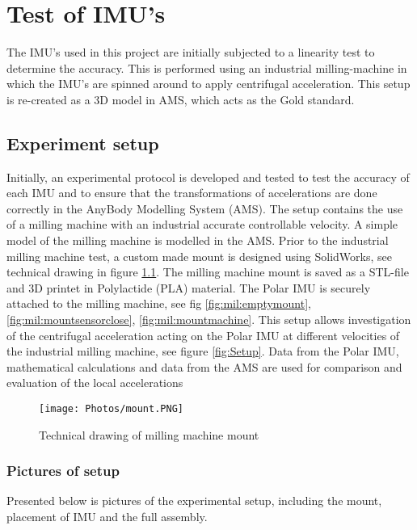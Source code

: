 \chapter{Test of IMU's}\label{ch:ST}

The IMU's used in this project are initially subjected to a linearity test to determine the accuracy. This is performed using an industrial milling-machine in which the IMU's are spinned around to apply centrifugal acceleration. This setup is re-created as a 3D model in AMS, which acts as the Gold standard.

\section{Experiment setup}

Initially, an experimental protocol is developed and tested to test the accuracy of each IMU and to ensure that the transformations of accelerations are done correctly in the AnyBody Modelling System (AMS). The setup contains the use of a milling machine with an industrial accurate controllable velocity. A simple model of the milling machine is modelled in the AMS. Prior to the industrial milling machine test, a custom made mount is designed using SolidWorks, see technical drawing in figure \ref{fig:mount}. The milling machine mount is saved as a STL-file and 3D printet in Polylactide (PLA) material. The Polar IMU is securely attached to the milling machine, see fig \ref{fig:mil:emptymount}, \ref{fig:mil:mountsensorclose}, \ref{fig:mil:mountmachine}. This setup allows investigation of the centrifugal acceleration acting on the Polar IMU at different velocities of the industrial milling machine, see figure \ref{fig:Setup}. Data from the Polar IMU, mathematical calculations and data from the AMS are used for comparison and evaluation of the local accelerations \newline 

\begin{figure}[h!]
    \centering
    \texttt{[image: Photos/mount.PNG]}
    \caption{Technical drawing of milling machine mount}
    \label{fig:mount}
\end{figure}
\newpage

\subsection{Pictures of setup}
Presented below is pictures of the experimental setup, including the mount, placement of IMU and the full assembly.


